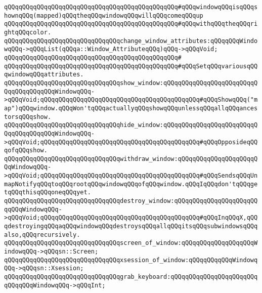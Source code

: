 \verb|qQQqqQQqqQQqqQQqqQQqqQQqqQQqqQQqqQQqqQQqqQQqqQQq#qQQqwindowqQQqisqQQqshownqQQq(mapped)qQQqtheqQQqwindowqQQqwillqQQqcomeqQQqup|\newline
\verb|qQQqqQQqqQQqqQQqqQQqqQQqqQQqqQQqqQQqqQQqqQQqqQQq#qQQqwithqQQqtheqQQqrightqQQqcolor.|\newline
\newline
\newline
\verb|qQQqqQQqqQQqqQQqqQQqqQQqqQQqqQQqchange_window_attributes:qQQqqQQqWindowqQQq->qQQqList(qQQqa::Window_AttributeqQQq)qQQq->qQQqVoid;|\newline
\verb|qQQqqQQqqQQqqQQqqQQqqQQqqQQqqQQqqQQqqQQqqQQqqQQq#|\newline
\verb|qQQqqQQqqQQqqQQqqQQqqQQqqQQqqQQqqQQqqQQqqQQqqQQq#qQQqSetqQQqvariousqQQqwindowqQQqattributes.|\newline
\newline
\verb|qQQqqQQqqQQqqQQqqQQqqQQqqQQqqQQqshow_window:qQQqqQQqqQQqqQQqqQQqqQQqqQQqqQQqqQQqqQQqWindowqQQq->qQQqVoid;qQQqqQQqqQQqqQQqqQQqqQQqqQQqqQQqqQQqqQQqqQQq#qQQqShowqQQq("map")qQQqwindow.qQQqWon'tqQQqactuallyqQQqshowqQQqunlessqQQqallqQQqancestorsqQQqshow.|\newline
\verb|qQQqqQQqqQQqqQQqqQQqqQQqqQQqqQQqhide_window:qQQqqQQqqQQqqQQqqQQqqQQqqQQqqQQqqQQqqQQqWindowqQQq->qQQqVoid;qQQqqQQqqQQqqQQqqQQqqQQqqQQqqQQqqQQqqQQqqQQq#qQQqOpposideqQQqofqQQqshow.|\newline
\verb|qQQqqQQqqQQqqQQqqQQqqQQqqQQqqQQqwithdraw_window:qQQqqQQqqQQqqQQqqQQqqQQqWindowqQQq->qQQqVoid;qQQqqQQqqQQqqQQqqQQqqQQqqQQqqQQqqQQqqQQqqQQq#qQQqSendsqQQqUnmapNotifyqQQqtoqQQqrootqQQqwindowqQQqofqQQqwindow.qQQqIqQQqdon'tqQQqgetqQQqthisqQQqoneqQQqyet.|\newline
\verb|qQQqqQQqqQQqqQQqqQQqqQQqqQQqqQQqdestroy_window:qQQqqQQqqQQqqQQqqQQqqQQqqQQqWindowqQQq->qQQqVoid;qQQqqQQqqQQqqQQqqQQqqQQqqQQqqQQqqQQqqQQqqQQq#qQQqInqQQqX,qQQqdestroyingqQQqaqQQqwindowqQQqdestroysqQQqallqQQqitsqQQqsubwindowsqQQqalso,qQQqrecursively.|\newline
\newline
\verb|qQQqqQQqqQQqqQQqqQQqqQQqqQQqqQQqscreen_of_window:qQQqqQQqqQQqqQQqqQQqWindowqQQq->qQQqsn::Screen;|\newline
\verb|qQQqqQQqqQQqqQQqqQQqqQQqqQQqqQQqxsession_of_window:qQQqqQQqqQQqWindowqQQq->qQQqsn::Xsession;|\newline
\newline
\verb|qQQqqQQqqQQqqQQqqQQqqQQqqQQqqQQqgrab_keyboard:qQQqqQQqqQQqqQQqqQQqqQQqqQQqqQQqWindowqQQq->qQQqInt;|\newline
